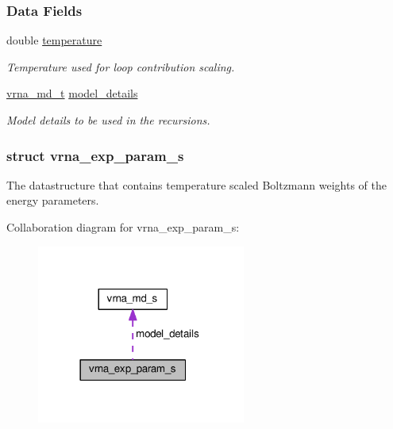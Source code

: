\subsubsection*{Data Fields}
\begin{DoxyCompactItemize}
\item 
\hypertarget{group__energy__parameters_aeed2cd83713012bcb52e431041e037c8}{}double \hyperlink{group__energy__parameters_aeed2cd83713012bcb52e431041e037c8}{temperature}\label{group__energy__parameters_aeed2cd83713012bcb52e431041e037c8}

\begin{DoxyCompactList}\small\item\em Temperature used for loop contribution scaling. \end{DoxyCompactList}\item 
\hypertarget{group__energy__parameters_a7b84353eb9075c595bad4ceb871bcae7}{}\hyperlink{group__model__details_ga1f8a10e12a0a1915f2a4eff0b28ea17c}{vrna\+\_\+md\+\_\+t} \hyperlink{group__energy__parameters_a7b84353eb9075c595bad4ceb871bcae7}{model\+\_\+details}\label{group__energy__parameters_a7b84353eb9075c595bad4ceb871bcae7}

\begin{DoxyCompactList}\small\item\em Model details to be used in the recursions. \end{DoxyCompactList}\end{DoxyCompactItemize}
\label{structvrna__exp__param__s}
\hypertarget{group__energy__parameters_structvrna__exp__param__s}{}
\subsubsection{struct vrna\+\_\+exp\+\_\+param\+\_\+s}
The datastructure that contains temperature scaled Boltzmann weights of the energy parameters. 

Collaboration diagram for vrna\+\_\+exp\+\_\+param\+\_\+s\+:
\nopagebreak
\begin{figure}[H]
\begin{center}
\leavevmode
\includegraphics[width=194pt]{structvrna__exp__param__s__coll__graph}
\end{center}
\end{figure}
